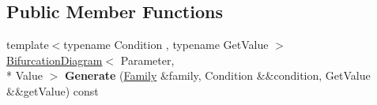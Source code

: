 \subsection*{Public Member Functions}
\begin{DoxyCompactItemize}
\item 
\hypertarget{struct_d_r_d_s_p_1_1_bifurcation_diagram_generator_a2dad56c3f7336b5df29d06667c4e9142}{{\footnotesize template$<$typename Condition , typename Get\-Value $>$ }\\\hyperlink{struct_d_r_d_s_p_1_1_bifurcation_diagram}{Bifurcation\-Diagram}$<$ Parameter, \\*
Value $>$ {\bfseries Generate} (\hyperlink{struct_d_r_d_s_p_1_1_family}{Family} \&family, Condition \&\&condition, Get\-Value \&\&get\-Value) const }\label{struct_d_r_d_s_p_1_1_bifurcation_diagram_generator_a2dad56c3f7336b5df29d06667c4e9142}

\end{DoxyCompactItemize}
